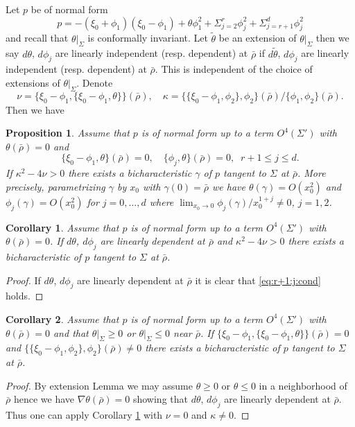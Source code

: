 \documentclass[12pt,leqno]{article} %
\def\ga{\gamma}
\def\bro{\bar\rho}
\def\bro{\bar\rho}
\numberwithin{equation}{section}
\newtheorem{prop}{Proposition}[section]
\newtheorem{cor}{Corollary}[section]
\begin{document}
Let $p$ be of normal form 
%
\[
p=-(\xi_0+\phi_1)(\xi_0-\phi_1)+\theta\phi_1^2+\Sigma_{j=2}^r\phi_j^2+\Sigma_{j=r+1}^d\phi_j^2
\]
%
and recall that $\theta|_{\Sigma}$ is conformally invariant. 
Let $\tilde\theta$ be an extension of $\theta|_{\Sigma}$ then we say $d\theta$, $d\phi_j$ are linearly independent (resp. dependent) at $\bro$ if $d\tilde\theta$, $d\phi_j$ are linearly independent (resp. dependent) at $\bro$. This is independent of the choice of extensions of $\theta|_{\Sigma}$. Denote
%
%
\[
\nu=\{\xi_0-\phi_1,\{\xi_0-\phi_1,\theta\}\}(\bro),\quad \kappa=\{\{\xi_0-\phi_1,\phi_2\},\phi_2\}(\bro)/\{\phi_1,\phi_2\}(\bro).
\]
% 
Then we have
%
%
\begin{prop}
\label{pro:tang_bicha:main}
Assume that $p$ is of normal form up to a term $O^4(\Sigma')$ with $\theta(\bro)=0$ and
%
\begin{equation}
\label{eq:r+1:j:cond} 
\{\xi_0-\phi_1,\theta\}(\bro)=0,\quad \{\phi_j,\theta\}(\bro)= 0,\;\; r+1\leq j\leq d.
\end{equation}
%
If $\kappa^2-4\nu> 0$ there exists a bicharacteristic $\ga$ of $p$ tangent to $\Sigma$ at $\bro$. More precisely, parametrizing $\ga$ by $x_0$ with $\ga(0)=\bro$ we have $\theta(\ga)=O(x_0^2)$ and $\phi_j(\ga)=O(x_0^2)$ for $j=0,\ldots, d$ where $\lim_{x_0\to 0}\phi_j(\ga)/x_0^{1+j}\neq 0$, $j=1,2$.
\end{prop}
%
%
%
\begin{cor}
\label{cor:tang_bicha:dep}
%
Assume that $p$ is of normal form up to a term $O^4(\Sigma')$ with $\theta(\bro)=0$. If $d\theta$, $d\phi_j$ are linearly dependent at $\bro$  and $\kappa^2-4\nu> 0$ there exists a bicharacteristic of $p$ tangent to $\Sigma$ at $\bro$.
\end{cor}
%
\begin{proof}If $d\theta$, $d\phi_j$ are linearly dependent at $\bro$ it is clear that \eqref{eq:r+1:j:cond} holds.
\end{proof}
%
\begin{cor}
\label{cor:te:teiti} Assume that $p$ is of normal form up to a term $O^4(\Sigma')$ with $\theta(\bro)=0$ and that $\theta|_{\Sigma}\geq 0$ or $\theta|_{\Sigma}\leq 0$ near $\bro$. If $\{\xi_0-\phi_1,\{\xi_0-\phi_1,\theta\}\}(\bro)= 0$ and $\{\{\xi_0-\phi_1,\phi_2\},\phi_2\}(\bro)\neq  0$ there exists a bicharacteristic of $p$ tangent to $\Sigma$ at $\bro$. 
\end{cor}
%
%
\begin{proof}By extension Lemma we may assume $\theta\geq 0$ or $\theta\leq 0$ in a neighborhood of $\bro$ hence we have $\nabla \theta(\bro)=0$ showing that $d\theta$, $d\phi_j$ are linearly dependent at $\bro$. Thus one can apply Corollary \ref{cor:tang_bicha:dep} with $\nu= 0$ and $\kappa\neq 0$. 
\end{proof}
\end{document}
